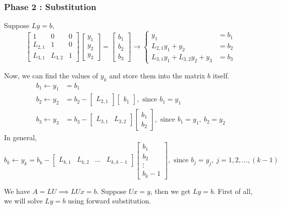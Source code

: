 \subsubsection{Phase 2 : Substitution}
\begin{commentary}
	Suppose $Ly = b$,
	\[ \begin{bmatrix} 1 & 0 &  0 \\ L_{2,1} & 1 & 0 \\ L_{3,1} & L_{3,2} & 1 \end{bmatrix} \begin{bmatrix} y_1 \\ y_2 \\ y_3 \end{bmatrix} = \begin{bmatrix} b_1 \\ b_2 \\ b_3 \end{bmatrix} \to \begin{cases} y_1 & = b_1 \\ L_{2,1}y_1 + y_2 & = b_2 \\ L_{3,1}y_1 + L_{3,2}y_2 + y_3 & = b_3 \end{cases} \]

	Now, we can find the values of $y_k$ and store them into the matrix $b$ itself.
	\begin{align*}
		b_1 \leftarrow y_1 & = b_1 \\
		b_2 \leftarrow y_2 & = b_2 - \begin{bmatrix} L_{2,1} \end{bmatrix} \begin{bmatrix} b_1 \end{bmatrix},\text{ since } b_1 = y_1 \\
			b_3 \leftarrow y_3 & = b_3 - \begin{bmatrix} L_{3,1} & L_{3,2} \end{bmatrix} \begin{bmatrix} b_1 \\ b_2 \end{bmatrix},\text{ since } b_1 = y_1,\ b_2 = y_2
	\end{align*}
	In general,
	\[ b_k \leftarrow y_k = b_k - \begin{bmatrix} L_{k,1} & L_{k,2} & \dots & L_{k,k-1} \end{bmatrix} \begin{bmatrix} b_1 \\ b_2 \\ \vdots \\ b_k-1 \end{bmatrix},\text{ since } b_j = y_j,\ j = 1,2,\dots,(k-1) \]
\end{commentary}
	We have $A = LU \implies LUx = b$.
	Suppose $Ux = y$, then we get $Ly = b$.
	First of all, we will solve $Ly = b$ using forward substitution.

